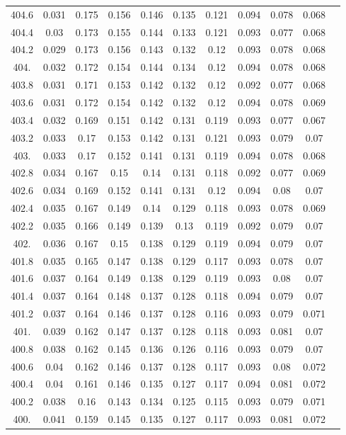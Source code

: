 \documentclass[12pt]{ctexart}
\numberwithin{equation}{section}
\begin{document}
\begin{longtable}{ccccccccccc}
404.6	&	0.031	&	0.175	&	0.156	&	0.146	&	0.135	&	0.121	&	0.094	&	0.078	&	0.068	\\
404.4	&	0.03	&	0.173	&	0.155	&	0.144	&	0.133	&	0.121	&	0.093	&	0.077	&	0.068	\\
404.2	&	0.029	&	0.173	&	0.156	&	0.143	&	0.132	&	0.12	&	0.093	&	0.078	&	0.068	\\
404.	&	0.032	&	0.172	&	0.154	&	0.144	&	0.134	&	0.12	&	0.094	&	0.078	&	0.068	\\
403.8	&	0.031	&	0.171	&	0.153	&	0.142	&	0.132	&	0.12	&	0.092	&	0.077	&	0.068	\\
403.6	&	0.031	&	0.172	&	0.154	&	0.142	&	0.132	&	0.12	&	0.094	&	0.078	&	0.069	\\
403.4	&	0.032	&	0.169	&	0.151	&	0.142	&	0.131	&	0.119	&	0.093	&	0.077	&	0.067	\\
403.2	&	0.033	&	0.17	&	0.153	&	0.142	&	0.131	&	0.121	&	0.093	&	0.079	&	0.07	\\
403.	&	0.033	&	0.17	&	0.152	&	0.141	&	0.131	&	0.119	&	0.094	&	0.078	&	0.068	\\
402.8	&	0.034	&	0.167	&	0.15	&	0.14	&	0.131	&	0.118	&	0.092	&	0.077	&	0.069	\\
402.6	&	0.034	&	0.169	&	0.152	&	0.141	&	0.131	&	0.12	&	0.094	&	0.08	&	0.07	\\
402.4	&	0.035	&	0.167	&	0.149	&	0.14	&	0.129	&	0.118	&	0.093	&	0.078	&	0.069	\\
402.2	&	0.035	&	0.166	&	0.149	&	0.139	&	0.13	&	0.119	&	0.092	&	0.079	&	0.07	\\
402.	&	0.036	&	0.167	&	0.15	&	0.138	&	0.129	&	0.119	&	0.094	&	0.079	&	0.07	\\
401.8	&	0.035	&	0.165	&	0.147	&	0.138	&	0.129	&	0.117	&	0.093	&	0.078	&	0.07	\\
401.6	&	0.037	&	0.164	&	0.149	&	0.138	&	0.129	&	0.119	&	0.093	&	0.08	&	0.07	\\
401.4	&	0.037	&	0.164	&	0.148	&	0.137	&	0.128	&	0.118	&	0.094	&	0.079	&	0.07	\\
401.2	&	0.037	&	0.164	&	0.146	&	0.137	&	0.128	&	0.116	&	0.093	&	0.079	&	0.071	\\
401.	&	0.039	&	0.162	&	0.147	&	0.137	&	0.128	&	0.118	&	0.093	&	0.081	&	0.07	\\
400.8	&	0.038	&	0.162	&	0.145	&	0.136	&	0.126	&	0.116	&	0.093	&	0.079	&	0.07	\\
400.6	&	0.04	&	0.162	&	0.146	&	0.137	&	0.128	&	0.117	&	0.093	&	0.08	&	0.072	\\
400.4	&	0.04	&	0.161	&	0.146	&	0.135	&	0.127	&	0.117	&	0.094	&	0.081	&	0.072	\\
400.2	&	0.038	&	0.16	&	0.143	&	0.134	&	0.125	&	0.115	&	0.093	&	0.079	&	0.071	\\
400.	&	0.041	&	0.159	&	0.145	&	0.135	&	0.127	&	0.117	&	0.093	&	0.081	&	0.072	\\
\end{longtable}
\end{document}
